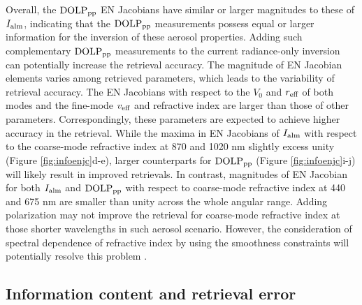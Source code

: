 Overall, the $\text{DOLP}_\text{pp}$ EN Jacobians have similar or larger magnitudes to these of
$I_\text{alm}$, indicating that the $\text{DOLP}_\text{pp}$ measurements possess equal or larger
information for the inversion of these aerosol properties. Adding such
complementary $\text{DOLP}_\text{pp}$ measurements to the current radiance-only inversion can
potentially increase the retrieval accuracy. The magnitude of EN Jacobian
elements varies among retrieved parameters, which leads to the variability of
retrieval accuracy. The EN Jacobians with respect to the $V_0$ and $r_\text{eff}$ of both
modes and the fine-mode $v_\text{eff}$ and refractive index are larger than those of
other parameters. Correspondingly, these parameters are expected to achieve
higher accuracy in the retrieval. While the maxima in EN Jacobians of $I_\text{alm}$
with respect to the coarse-mode refractive index at 870 and 1020 nm slightly
excess unity (Figure \ref{fig:infoenjc}d-e), larger counterparts for $\text{DOLP}_\text{pp}$ 
(Figure \ref{fig:infoenjc}i-j) will likely result in improved retrievals. 
In contrast, magnitudes of EN Jacobian for both $I_\text{alm}$ and  $\text{DOLP}_\text{pp}$ with 
respect to coarse-mode refractive index at 440 and 675 nm are smaller than 
unity across the whole angular range. Adding polarization may not improve the
retrieval for coarse-mode refractive index at those shorter wavelengths in 
such aerosol scenario. However, the consideration of spectral dependence of 
refractive index by using the smoothness constraints will potentially resolve
this problem \citep{Dubovik04}.

\subsection{Information content and retrieval error}

